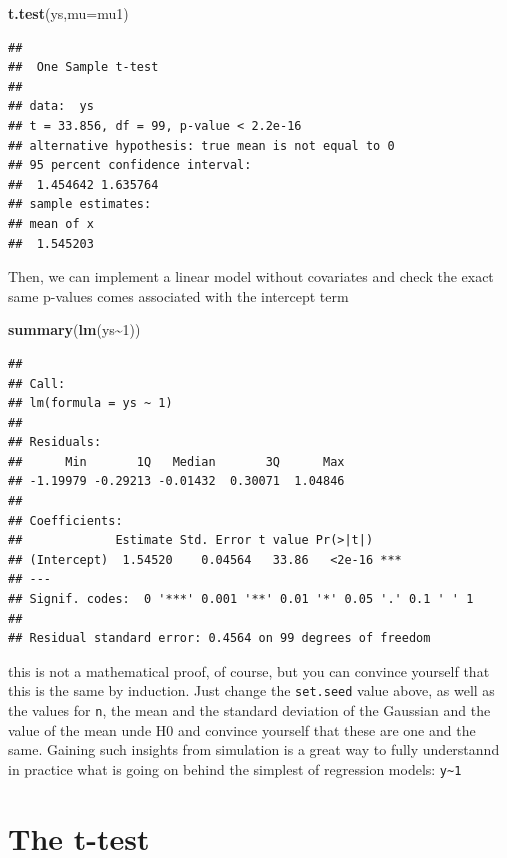 \documentclass[
]{book}
\newenvironment{Shaded}{\begin{snugshade}}{\end{snugshade}}
\newcommand{\AttributeTok}[1]{\textcolor[rgb]{0.13,0.29,0.53}{#1}}
\newcommand{\DecValTok}[1]{\textcolor[rgb]{0.00,0.00,0.81}{#1}}
\newcommand{\FunctionTok}[1]{\textcolor[rgb]{0.13,0.29,0.53}{\textbf{#1}}}
\newcommand{\NormalTok}[1]{#1}
\newcommand{\SpecialCharTok}[1]{\textcolor[rgb]{0.81,0.36,0.00}{\textbf{#1}}}
\begin{document}
\begin{Shaded}
\begin{Highlighting}[]
\FunctionTok{t.test}\NormalTok{(ys,}\AttributeTok{mu=}\NormalTok{mu1)}
\end{Highlighting}
\end{Shaded}

\begin{verbatim}
## 
##  One Sample t-test
## 
## data:  ys
## t = 33.856, df = 99, p-value < 2.2e-16
## alternative hypothesis: true mean is not equal to 0
## 95 percent confidence interval:
##  1.454642 1.635764
## sample estimates:
## mean of x 
##  1.545203
\end{verbatim}

Then, we can implement a linear model without covariates and check the exact same p-values comes associated with the intercept term

\begin{Shaded}
\begin{Highlighting}[]
\FunctionTok{summary}\NormalTok{(}\FunctionTok{lm}\NormalTok{(ys}\SpecialCharTok{\textasciitilde{}}\DecValTok{1}\NormalTok{))}
\end{Highlighting}
\end{Shaded}

\begin{verbatim}
## 
## Call:
## lm(formula = ys ~ 1)
## 
## Residuals:
##      Min       1Q   Median       3Q      Max 
## -1.19979 -0.29213 -0.01432  0.30071  1.04846 
## 
## Coefficients:
##             Estimate Std. Error t value Pr(>|t|)    
## (Intercept)  1.54520    0.04564   33.86   <2e-16 ***
## ---
## Signif. codes:  0 '***' 0.001 '**' 0.01 '*' 0.05 '.' 0.1 ' ' 1
## 
## Residual standard error: 0.4564 on 99 degrees of freedom
\end{verbatim}

this is not a mathematical proof, of course, but you can convince yourself that this is the same by induction. Just change the \texttt{set.seed} value above, as well as the values for \texttt{n}, the mean and the standard deviation of the Gaussian and the value of the mean unde H0 and convince yourself that these are one and the same. Gaining such insights from simulation is a great way to fully understannd in practice what is going on behind the simplest of regression models: \texttt{y\textasciitilde{}1}

\section{The t-test}\label{the-t-test}
\end{document}
